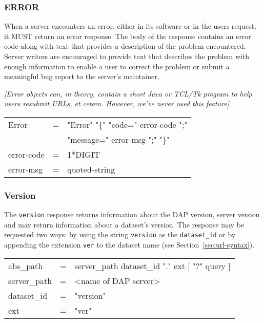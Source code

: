\documentclass{article}
\begin{document}
\subsubsection{ERROR}
\label{sec:error}
When a server encounters an error, either in its software or in the users
request, it MUST return an error response. The body of the response contains
an error code along with text that provides a description of the problem
encountered. Server writers are encouraged to provide text that describes the
problem with enough information to enable a user to correct the problem or
submit a meaningful bug report to the server's maintainer.

\emph{[Error objects can, in theory, contain a short Java or TCL/Tk program
  to help users resubmit URLs, et cetera. However, we've never used this
  feature]}

\begin{ttfamily}
\begin{center}
\begin{tabular}{lll}
Error & = & "Error" "\{" "code=" error-code ";" \\
      & & "message=" error-msg ";" "\}" \\
error-code & = & 1*DIGIT \\
error-msg & = & quoted-string \\
\end{tabular}
\end{center}
\end{ttfamily}

\subsubsection{Version}
\label{sec:version}
The \texttt{version} response returns information about the \ac{DAP} version,
server version and may return information about a dataset's version. The
response may be requested two ways: by using the string \texttt{version}
as the \texttt{dataset\_id} or by appending the extension
\texttt{ver} to the dataset name (see Section~\ref{sec:url-syntax}). 

\begin{ttfamily}
\begin{center}
\begin{tabular}{lll}
abs\_path & = & server\_path dataset\_id "." ext [ "?" query ] \\
server\_path & = & <name of DAP server> \\
dataset\_id & = & "version" \\
ext & = & "ver" \\
\end{tabular}
\end{center}
\end{ttfamily}
\end{document}
